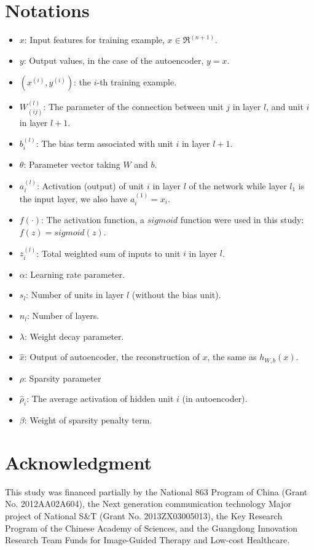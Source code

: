 \documentclass[journal]{IEEEtran}
\begin{document}
\section{Notations}
\begin{itemize}
\item $x$: Input features for training example, $x \in \Re^{(n+1)}$.
\item $y$: Output values, in the case of the autoencoder, $y=x$.
\item $(x^{(i)},y^{(i)})$: the $i$-th training example.
\item $W_{(ij)}^{(l)}$: The parameter of the connection between unit $j$ in layer $l$, and unit $i$ in layer $l+1$.
\item $b_i^{(l)}$: The bias term associated with unit $i$ in layer $l+1$.
\item $\theta$: Parameter vector taking $W$ and $b$.
\item $a_i^{(l)}$: Activation (output) of unit $i$ in layer $l$ of the network while layer $l_1$ is the input layer, we also have $a^{(1)}_i = x_i$.
\item $f(\cdot)$: The activation function, a $sigmoid$ function were used in this study: $f(z) = sigmoid(z)$.
\item $z_i^{(l)}$: Total weighted sum of inputs to unit $i$ in layer $l$.
\item $\alpha$: Learning rate parameter.
\item $s_l$: Number of units in layer $l$ (without the bias unit).
\item $n_l$: Number of layers.
\item $\lambda$: Weight decay parameter.
\item $\hat{x}$: Output of autoencoder, the reconstruction of $x$, the same as $h_{W,b}(x)$.
\item $\rho$: Sparsity parameter
\item $\hat{\rho}_i$: The average activation of hidden unit $i$ (in autoencoder).
\item $\beta$: Weight of sparsity penalty term.

\end{itemize}


\section*{Acknowledgment}
This study was financed partially by the National 863 Program of China (Grant No. 2012AA02A604), the Next generation communication technology Major project of National S\&T (Grant No. 2013ZX03005013), the Key Research Program of the Chinese Academy of Sciences, and the Guangdong Innovation Research Team Funds for Image-Guided Therapy and Low-cost Healthcare. 
\ifCLASSOPTIONcaptionsoff
  \newpage
\fi
\end{document}
